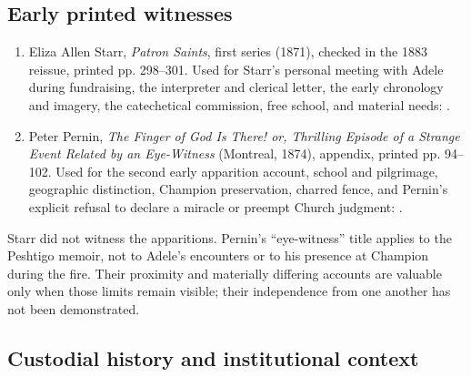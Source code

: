 \subsection{Early printed witnesses}

\begin{enumerate}
  \item Eliza Allen Starr, \emph{Patron Saints}, first series (1871), checked in the 1883 reissue, printed pp. 298--301. Used for Starr's personal meeting with Adele during fundraising, the interpreter and clerical letter, the early chronology and imagery, the catechetical commission, free school, and material needs: .
  \item Peter Pernin, \emph{The Finger of God Is There! or, Thrilling Episode of a Strange Event Related by an Eye-Witness} (Montreal, 1874), appendix, printed pp. 94--102. Used for the second early apparition account, school and pilgrimage, geographic distinction, Champion preservation, charred fence, and Pernin's explicit refusal to declare a miracle or preempt Church judgment: .
\end{enumerate}

Starr did not witness the apparitions. Pernin's “eye-witness” title applies to the Peshtigo memoir, not to Adele's encounters or to his presence at Champion during the fire. Their proximity and materially differing accounts are valuable only when those limits remain visible; their independence from one another has not been demonstrated.

\subsection{Custodial history and institutional context}

